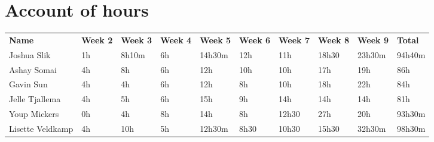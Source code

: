 \chapter{Account of hours}

\begin{table}[h]
\begin{adjustwidth}{-1.2cm}{}
\begin{tabular}{l | l | l | l | l | l | l | l | l | l}
\textbf{Name}    & \textbf{Week 2} & \textbf{Week 3} & \textbf{Week 4} & \textbf{Week 5} & \textbf{Week 6} & \textbf{Week 7} & \textbf{Week 8} & \textbf{Week 9} & \textbf{Total}  \\
Joshua Slik      & 1h     & 8h10m  & 6h     & 14h30m & 12h    & 11h    & 18h30  & 23h30m & 94h40m \\
Ashay Somai      & 4h     & 8h     & 6h     & 12h    & 10h    & 10h    & 17h    & 19h    & 86h    \\
Gavin Sun        & 4h     & 4h     & 6h     & 12h    & 8h     & 10h    & 18h    & 22h    & 84h    \\
Jelle Tjallema   & 4h     & 5h     & 6h     & 15h    & 9h     & 14h    & 14h    & 14h    & 81h    \\
Youp Mickers     & 0h     & 4h     & 8h     & 14h    & 8h     & 12h30  & 27h    & 20h    & 93h30m \\
Lisette Veldkamp & 4h     & 10h    & 5h     & 12h30m & 8h30   & 10h30  & 15h30  & 32h30m & 98h30m \\
\end{tabular}
\end{adjustwidth}
\end{table}